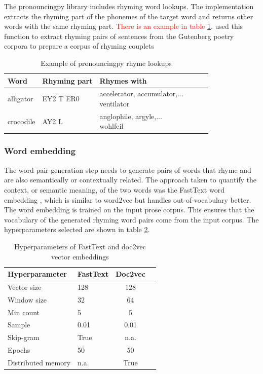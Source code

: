 \documentclass[11pt,a4paper]{article}
\begin{document}
The pronouncingpy library includes rhyming word lookups. The implementation extracts the rhyming part of the phonemes of the target word and returns other words with the same rhyming part. \textcolor{red}{There is an example in table \ref{table:pronouncingrhymes}}. \citet{cole} used this function to extract rhyming pairs of sentences from the Gutenberg poetry corpora to prepare a corpus of rhyming couplets

\begin{table}
\centering
\begin{tabular}{lll c c c}
	\hline\hline
	Word & Rhyming part & Rhymes with \\ [0.5ex]
	\hline\hline
	alligator & EY2 T ER0 & \makecell[l]{accelerator, accumulator,...\\ventilator} \\ [0.5ex]
	\hline
	crocodile & AY2 L &  \makecell[l]{anglophile, argyle,...\\wohlfeil} \\ [0.5ex]
	\hline
\end{tabular}
\caption{Example of pronouncingpy rhyme lookups}
\label{table:pronouncingrhymes}
\end{table}

\subsubsection{Word embedding}
\label{sec:fasttext}

The word pair generation step needs to generate pairs of words that rhyme and are also semantically or contextually related. The approach taken to quantify the context, or semantic meaning, of the two words was the FastText word embedding \cite{fasttext}, which is similar to word2vec \cite{wordvec} but handles out-of-vocabulary better. The word embedding is trained on the input prose corpus. This ensures that the vocabulary of the generated rhyming word pairs come from the input corpus. The hyperparameters selected are shown in table \ref{table:HP_fasttext}.

\begin{table}[ht]
\centering
\begin{tabular}{ll c c}
	\hline\hline
	Hyperparameter & FastText & Doc2vec \\ [0.5ex]
	\hline\hline
	Vector size & 128 & 128 \\ [0.5ex]
	Window size & 32 & 64 \\ [0.5ex]
	Min count & 5 & 5 \\ [0.5ex]
	Sample & 0.01 & 0.01 \\ [0.5ex]
	Skip-gram & True & n.a. \\ [0.5ex]
	Epochs & 50 & 50 \\ [0.5ex]
	Distributed memory & n.a. & True \\ [0.5ex]
	\hline
\end{tabular}
\caption{Hyperparameters of FastText and doc2vec vector embeddings}
\label{table:HP_fasttext}
\end{table}
\end{document}
